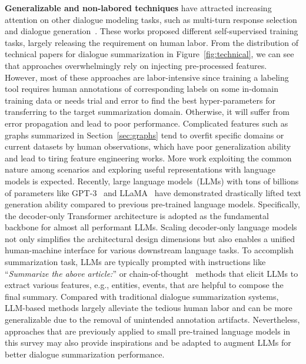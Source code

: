 \textbf{Generalizable and non-labored techniques} have attracted increasing attention on other dialogue modeling tasks, 
such as multi-turn response selection~\cite{xu2021learning} and 
dialogue generation~\cite{zhang2019consistent}. 
These works proposed different self-supervised training tasks, largely releasing the requirement on human labor.
From the distribution of technical papers for dialogue summarization in Figure~\ref{fig:technical}, we can see that approaches overwhelmingly 
rely on injecting pre-processed features. 
However, most of these approaches are labor-intensive since training a labeling tool requires human annotations of corresponding labels on some in-domain training data or needs trial and error to find the best hyper-parameters for transferring to the target summarization domain. Otherwise, it will suffer from error propagation and lead to poor performance.
Complicated features such as graphs summarized in Section~\ref{sec:graphs} tend to overfit specific domains or current datasets by human observations,
which have poor generalization ability and lead to tiring feature engineering works. More work exploiting the common nature among scenarios and exploring useful representations with language models is expected. 
Recently, large language models~(LLMs) with tons of billions of parameters like GPT-3~\cite{brown2020language} and LLaMA~\cite{touvron2023llama} have demonstrated drastically lifted text generation ability compared to previous pre-trained language models. Specifically, the decoder-only Transformer architecture is adopted as the fundamental backbone for almost all performant LLMs. Scaling decoder-only language models not only simplifies the architectural design dimensions but also enables a unified human-machine interface for various downstream language tasks. 
To accomplish summarization task, LLMs are typically prompted with instructions like ``\textit{Summarize the above article:}'' or chain-of-thought~\cite{cot,wang-etal-2023-element} methods that elicit LLMs to extract various features, e.g., entities, events, that are helpful to compose the final summary. Compared with traditional dialogue summarization systems, LLM-based methods largely alleviate the tedious human labor and can be more generalizable due to the removal of unintended annotation artifacts. Nevertheless, approaches that are previously applied to small pre-trained language models in this survey may also provide inspirations and be adapted to augment LLMs for better dialogue summarization performance.

